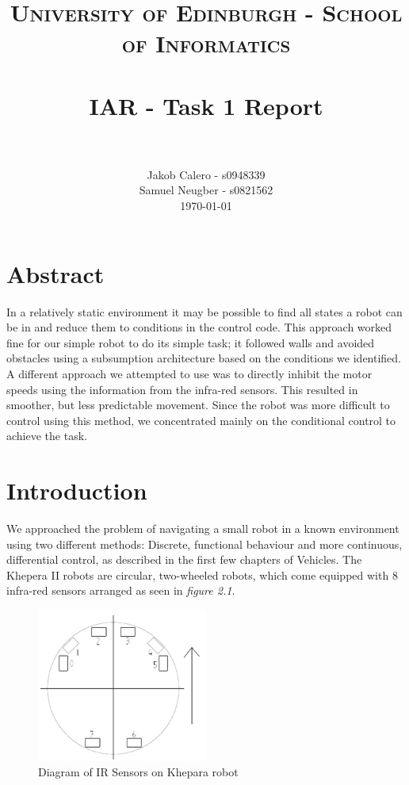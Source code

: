 \documentclass[paper=a4, fontsize=12pt]{scrartcl}	%
\title{
\vspace{-1in} 	
\usefont{OT1}{bch}{b}{n}
\normalfont \normalsize \textsc{University of Edinburgh - School of Informatics} \\ [25pt]
\horrule{0.5pt} \\[0.4cm]
\large IAR - Task 1 Report \\
\horrule{1pt} \\[0.5cm]
}
\author{
  \normalfont \normalsize
  Jakob Calero - s0948339\\[-3pt]\normalsize
  Samuel Neugber - s0821562\\[-3pt]\normalsize
  \today
}
\date{}
\numberwithin{equation}{section}		%
\numberwithin{figure}{section}			%
\numberwithin{table}{section}				%
\begin{document}
\maketitle					%
\section{Abstract}
In a relatively static environment it may be possible to find all states a robot can be in and reduce them to conditions in the control code. This approach worked fine for our simple robot to do its simple task; it followed walls and avoided obstacles using a subsumption architecture based on the conditions we identified. A different approach we attempted to use was to directly inhibit the motor speeds using the information from the infra-red sensors. This resulted in smoother, but less predictable movement. Since the robot was more difficult to control using this method, we concentrated mainly on the conditional control to achieve the task.

\section{Introduction}
We approached the problem of navigating a small robot in a known environment using two different methods: Discrete, functional behaviour and more continuous, differential control, as described in the first few chapters of Vehicles\cite{vehicles}. The Khepera II robots are circular, two-wheeled robots, which come equipped with 8 infra-red sensors arranged as seen in \emph{figure 2.1}. 
\begin{figure}[!ht]
 \centering
  \includegraphics[width=0.5\textwidth]{IRSensors}
  \caption{Diagram of IR Sensors on Khepara robot}
\end{figure}
\end{document}

